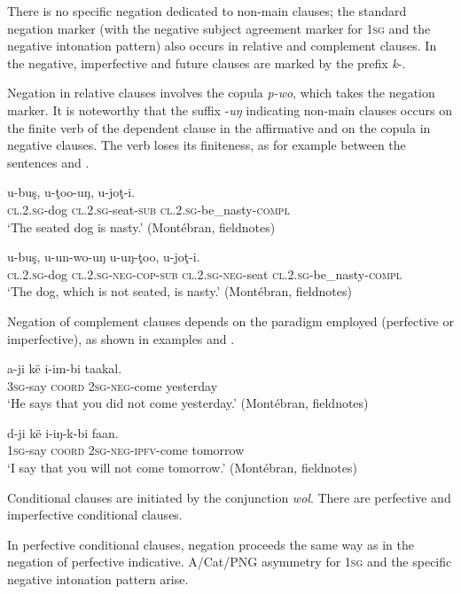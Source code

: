 \documentclass[output=paper,colorlinks,citecolor=brown]{langscibook}
\begin{document}
There is no specific negation dedicated to non-main clauses; the standard negation marker (with the negative subject agreement marker for \textsc{1sg} and the negative intonation pattern) also occurs in relative and complement clauses. In the negative, imperfective and future clauses are marked by the prefix \textit{k}{}-. 

Negation in relative clauses involves the copula \textit{p-wo}, which takes the negation marker. It is noteworthy that the suffix -\textit{uŋ} indicating non-main clauses occurs on the finite verb of the dependent clause in the affirmative and on the copula in negative clauses. The verb loses its finiteness, as for example between the sentences  and . 

\ea\label{ex:mank:51}
    \gll u-buş, u-ţoo-uŋ, u-joţ-i.\\
         \textsc{cl.2.sg}-dog \textsc{cl.2.sg}-seat{}-\textsc{sub} \textsc{cl.2.sg}-be\_nasty-\textsc{compl}\\ 
    \glt ‘The seated dog is nasty.’ (Montébran, fieldnotes)
\z

\ea\label{ex:mank:52}
    \gll u-buş, u-un-wo-uŋ u-uŋ-ţoo, u-joţ-i. \\
         \textsc{cl.2.sg}-dog \textsc{cl.2.sg{}-neg-cop-sub} \textsc{cl.2.sg{}-neg}-seat \textsc{cl.2.sg}-be\_nasty-\textsc{compl} \\
    \glt ‘The dog, which is not seated, is nasty.’ (Montébran, fieldnotes)
\z

Negation of complement clauses depends on the paradigm employed (perfective or imperfective), as shown in examples  and . 

\ea\label{ex:mank:53}
    \gll a-ji kë i-im-bi taakal.\\
         \textsc{3sg}-say \textsc{coord} \textsc{2sg{}-neg}-come yesterday\\
    \glt ‘He says that you did not come yesterday.’ (Montébran, fieldnotes)
\z

\ea\label{ex:mank:54}
    \gll d{}-ji kë i-iŋ-k-bi faan.\\
         \textsc{1sg}-say \textsc{coord} \textsc{2sg-neg-ipfv}-come tomorrow\\
    \glt ‘I say that you will not come tomorrow.’ (Montébran, fieldnotes)
\z

Conditional clauses are initiated by the conjunction \textit{wol}. There are perfective and imperfective conditional clauses. 

In perfective conditional clauses, negation proceeds the same way as in the negation of perfective indicative. A/Cat/PNG asymmetry for \textsc{1sg} and the specific negative intonation pattern arise.
\end{document}
